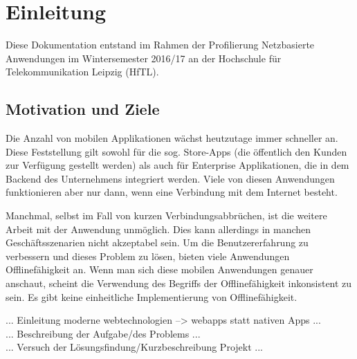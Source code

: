 \chapter{Einleitung}

Diese Dokumentation entstand im Rahmen der Profilierung \glqq Netzbasierte Anwendungen\grqq{} im Wintersemester 2016/17 an der Hochschule für Telekommunikation Leipzig (HfTL).


\section{Motivation und Ziele}
\label{sec_einleitung_motivation-ziele}

Die Anzahl von mobilen Applikationen wächst heutzutage immer schneller an. Diese Feststellung gilt sowohl für die sog. Store-Apps (die öffentlich den Kunden zur Verfügung gestellt werden) als auch für Enterprise Applikationen, die in dem Backend des Unternehmens integriert werden. Viele von diesen Anwendungen funktionieren aber nur dann, wenn eine Verbindung mit dem Internet besteht.

Manchmal, selbst im Fall von kurzen Verbindungsabbrüchen, ist die weitere Arbeit mit der Anwendung unmöglich. Dies kann allerdings in manchen Geschäftsszenarien nicht akzeptabel sein. Um die Benutzererfahrung zu verbessern und dieses Problem zu lösen, bieten viele Anwendungen Offlinefähigkeit an. Wenn man sich diese mobilen Anwendungen genauer anschaut, scheint die Verwendung des Begriffs der Offlinefähigkeit inkonsistent zu sein. Es gibt keine einheitliche Implementierung von Offlinefähigkeit. 


... Einleitung moderne webtechnologien --> webapps statt nativen Apps ... \\
... Beschreibung der Aufgabe/des Problems ...\\

... Versuch der Lösungsfindung/Kurzbeschreibung Projekt ... \\

